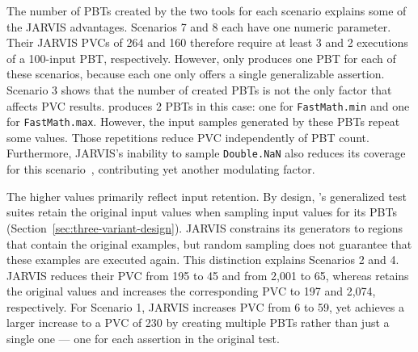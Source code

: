 The number of PBTs created by the two tools
for each scenario explains some of the JARVIS advantages.
Scenarios 7 and 8 each have one numeric parameter.
Their JARVIS PVCs of 264 and 160 therefore require at least 3 and 2
executions of a 100-input PBT, respectively.
However, \ToolTeralizer{} only produces one PBT for each of these scenarios,
because each one only offers a single generalizable assertion.
Scenario 3 shows that the number of created PBTs
is not the only factor that affects PVC results.
\ToolTeralizer{} produces 2 PBTs in this case:
one for \texttt{FastMath.min} and one for \texttt{FastMath.max}.
However, the input samples generated by these PBTs repeat some values.
Those repetitions reduce PVC independently of PBT count.
Furthermore, JARVIS's inability to sample \texttt{Double.NaN}
also reduces its coverage for this scenario~\cite{peleg_2018_jarvis},
contributing yet another modulating factor.



The higher \ToolTeralizer{} values primarily reflect input retention.
By design, \ToolTeralizer{}'s generalized test suites retain the original input values
when sampling input values for its PBTs
(Section~\ref{sec:three-variant-design}).
JARVIS constrains its generators to regions that contain the original examples,
but random sampling does not guarantee that these examples are executed again.
This distinction explains Scenarios 2 and 4.
JARVIS reduces their PVC from 195 to 45 and from 2,001 to 65,
whereas \ToolTeralizer{} retains the original values
and increases the corresponding PVC to 197 and 2,074, respectively.
For Scenario 1, JARVIS increases PVC from 6 to 59,
yet \ToolTeralizer{} achieves a larger increase to a PVC of 230
by creating multiple PBTs rather than just a single one
--- one for each assertion in the original test.


